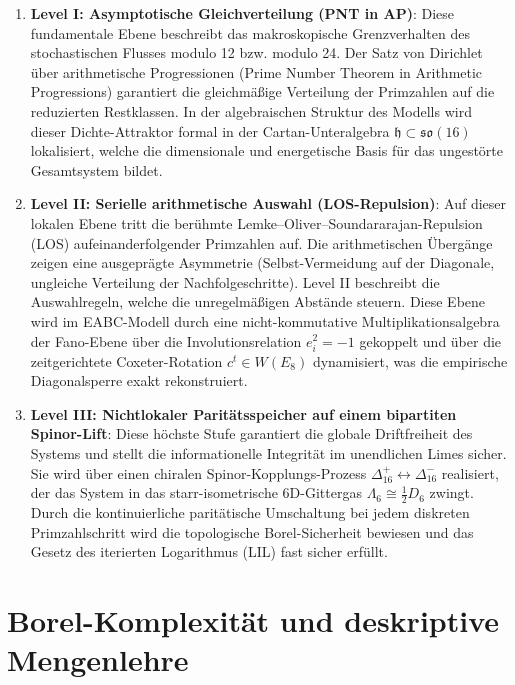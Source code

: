\documentclass[11pt,a4paper]{article}
\numberwithin{equation}{section}
\begin{document}
	\begin{enumerate}
		\item \textbf{Level I: Asymptotische Gleichverteilung (PNT in AP)}:
		Diese fundamentale Ebene beschreibt das makroskopische Grenzverhalten des stochastischen Flusses modulo 12 bzw. modulo 24. Der Satz von Dirichlet über arithmetische Progressionen (Prime Number Theorem in Arithmetic Progressions) garantiert die gleichmäßige Verteilung der Primzahlen auf die reduzierten Restklassen. In der algebraischen Struktur des Modells wird dieser Dichte-Attraktor formal in der Cartan-Unteralgebra $\mathfrak{h} \subset \mathfrak{so}(16)$ lokalisiert, welche die dimensionale und energetische Basis für das ungestörte Gesamtsystem bildet.
		
		\item \textbf{Level II: Serielle arithmetische Auswahl (LOS-Repulsion)}:
		Auf dieser lokalen Ebene tritt die berühmte Lemke--Oliver--Soundararajan-Repulsion (LOS) aufeinanderfolgender Primzahlen auf. Die arithmetischen Übergänge zeigen eine ausgeprägte Asymmetrie (Selbst-Vermeidung auf der Diagonale, ungleiche Verteilung der Nachfolgeschritte). Level II beschreibt die Auswahlregeln, welche die unregelmäßigen Abstände steuern. Diese Ebene wird im EABC-Modell durch eine nicht-kommutative Multiplikationsalgebra der Fano-Ebene über die Involutionsrelation $e_i^2 = -1$ gekoppelt und über die zeitgerichtete Coxeter-Rotation $c^t \in W(E_8)$ dynamisiert, was die empirische Diagonalsperre exakt rekonstruiert.
		
		\item \textbf{Level III: Nichtlokaler Paritätsspeicher auf einem bipartiten Spinor-Lift}:
		Diese höchste Stufe garantiert die globale Driftfreiheit des Systems und stellt die informationelle Integrität im unendlichen Limes sicher. Sie wird über einen chiralen Spinor-Kopplungs-Prozess $\Delta_{16}^+ \longleftrightarrow \Delta_{16}^-$ realisiert, der das System in das starr-isometrische $6\text{D}$-Gittergas $\Lambda_6 \cong \frac{1}{2}D_6$ zwingt. Durch die kontinuierliche paritätische Umschaltung bei jedem diskreten Primzahlschritt wird die topologische Borel-Sicherheit bewiesen und das Gesetz des iterierten Logarithmus (LIL) fast sicher erfüllt.
	\end{enumerate}
	
	\section{Borel-Komplexität und deskriptive Mengenlehre}
	
\end{document}
